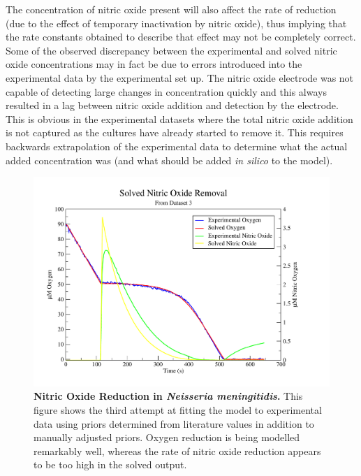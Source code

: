 The concentration of nitric oxide present will also affect the rate of \cbbthree{} reduction (due to the effect of temporary inactivation by nitric oxide), thus implying that the rate constants obtained to describe that effect may not be completely correct. Some of the observed discrepancy between the experimental and solved nitric oxide concentrations may in fact be due to errors introduced into the experimental data by the experimental set up. The nitric oxide electrode was not capable of detecting large changes in concentration quickly and this always resulted in a lag between nitric oxide addition and detection by the electrode. This is obvious in the experimental datasets where the total nitric oxide addition is not captured as the cultures have already started to remove it. This requires backwards extrapolation of the experimental data to determine what the actual added concentration was (and what should be added \textit{in silico} to the model).

\begin{figure}[tbp]
 \centering
 \includegraphics[width=15cm, trim=1cm 1cm 3cm 1cm, clip=true]{./06-noreduction/data/aer-no-sim3-1.pdf}
 \caption[{Nitric Oxide Reduction in \textit{Neisseria meningitidis}.}]{{\bf Nitric Oxide Reduction in \textit{Neisseria meningitidis}.} This figure shows the third attempt at fitting the model to experimental data using priors determined from literature values in addition to manually adjusted priors. Oxygen reduction is being modelled remarkably well, whereas the rate of nitric oxide reduction appears to be too high in the solved output.}
 \label{fig:nosim3.2}
\end{figure}

